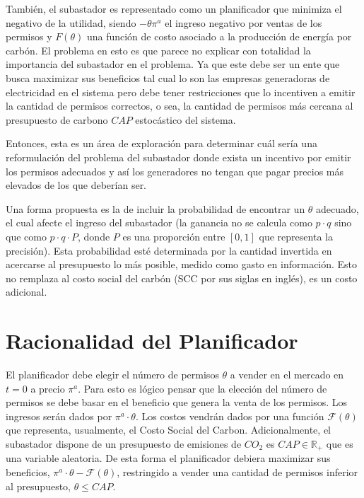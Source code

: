 También, el subastador es representado como un planificador que minimiza el negativo de la utilidad, siendo $-\theta \pi^a$ el ingreso negativo por ventas de los permisos y $F(\theta)$ una función de costo asociado a la producción de energía por carbón. El problema en esto es que parece no explicar con totalidad la importancia del subastador en el problema. Ya que este debe ser un ente que busca maximizar sus beneficios tal cual  lo son las empresas generadoras de electricidad en el sistema pero debe tener restricciones que lo incentiven a emitir la cantidad de permisos correctos, o sea, la cantidad de permisos más cercana al presupuesto de carbono $CAP$ estocástico del sistema.
\vspace{2.5mm}

Entonces, esta es un área de exploración para determinar cuál sería una reformulación del problema del subastador donde exista un incentivo por emitir los permisos adecuados y así los generadores no tengan que pagar precios más elevados de los que deberían ser.
\vspace{2.5mm}

Una forma propuesta es la de incluir la probabilidad de encontrar un $\theta$ adecuado, el cual afecte el ingreso del subastador (la ganancia no se calcula como $p\cdot q$ sino que como $p\cdot q\cdot P$, donde $P$ es una proporción entre $[0,1]$ que representa la precisión). Esta probabilidad esté determinada por la cantidad invertida en acercarse al presupuesto lo más posible, medido como gasto en información. Esto no remplaza al costo social del carbón (SCC por sus siglas en inglés), es un costo adicional.


\section{Racionalidad del Planificador}

El planificador debe elegir el número de permisos $\theta$ a vender en el mercado en $t=0$ a precio $\pi^a$. Para esto es lógico pensar que la elección del número de permisos se debe basar en el beneficio que genera la venta de los permisos. Los ingresos serán dados por $\pi^a\cdot\theta$. Los costos vendrán dados por una función $\mathcal{F}(\theta)$ que representa, usualmente, el Costo Social del Carbon. Adicionalmente, el subastador dispone de un presupuesto de emisiones de $CO_2$ es $CAP\in\mathbb{R}_+$ que es una variable aleatoria. De esta forma el planificador debiera maximizar sus beneficios, $\pi^a\cdot\theta-\mathcal{F}(\theta)$, restringido a vender una cantidad de permisos inferior al presupuesto, $\theta\leq CAP$.
\vspace{2.5mm}

